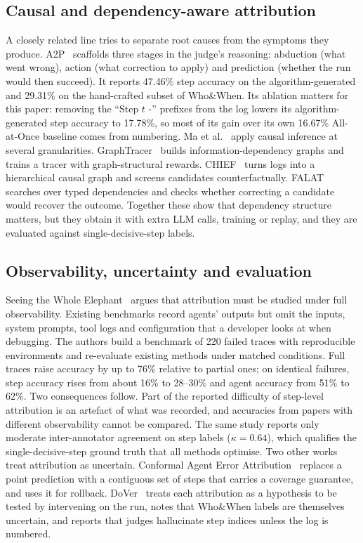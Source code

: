 \documentclass[conference]{IEEEtran}
\begin{document}
\subsection{Causal and dependency-aware attribution}
A closely related line tries to separate root causes from the symptoms they produce. A2P~\cite{west2025a2p} scaffolds three stages in the judge's reasoning: abduction (what went wrong), action (what correction to apply) and prediction (whether the run would then succeed). It reports 47.46\% step accuracy on the algorithm-generated and 29.31\% on the hand-crafted subset of Who\&When. Its ablation matters for this paper: removing the ``Step $t$ -'' prefixes from the log lowers its algorithm-generated step accuracy to 17.78\%, so most of its gain over its own 16.67\% All-at-Once baseline comes from numbering. Ma et al.~\cite{ma2025causal} apply causal inference at several granularities. GraphTracer~\cite{zhang2025graphtracer} builds information-dependency graphs and trains a tracer with graph-structural rewards. CHIEF~\cite{wang2026chief} turns logs into a hierarchical causal graph and screens candidates counterfactually. FALAT~\cite{rafi2026falat} searches over typed dependencies and checks whether correcting a candidate would recover the outcome. Together these show that dependency structure matters, but they obtain it with extra LLM calls, training or replay, and they are evaluated against single-decisive-step labels.

\subsection{Observability, uncertainty and evaluation}
Seeing the Whole Elephant~\cite{chen2026elephant} argues that attribution must be studied under full observability. Existing benchmarks record agents' outputs but omit the inputs, system prompts, tool logs and configuration that a developer looks at when debugging. The authors build a benchmark of 220 failed traces with reproducible environments and re-evaluate existing methods under matched conditions. Full traces raise accuracy by up to 76\% relative to partial ones; on identical failures, step accuracy rises from about 16\% to 28--30\% and agent accuracy from 51\% to 62\%. Two consequences follow. Part of the reported difficulty of step-level attribution is an artefact of what was recorded, and accuracies from papers with different observability cannot be compared. The same study reports only moderate inter-annotator agreement on step labels ($\kappa=0.64$), which qualifies the single-decisive-step ground truth that all methods optimise. Two other works treat attribution as uncertain. Conformal Agent Error Attribution~\cite{feng2026conformal} replaces a point prediction with a contiguous set of steps that carries a coverage guarantee, and uses it for rollback. DoVer~\cite{ma2025dover} treats each attribution as a hypothesis to be tested by intervening on the run, notes that Who\&When labels are themselves uncertain, and reports that judges hallucinate step indices unless the log is numbered.
\end{document}
